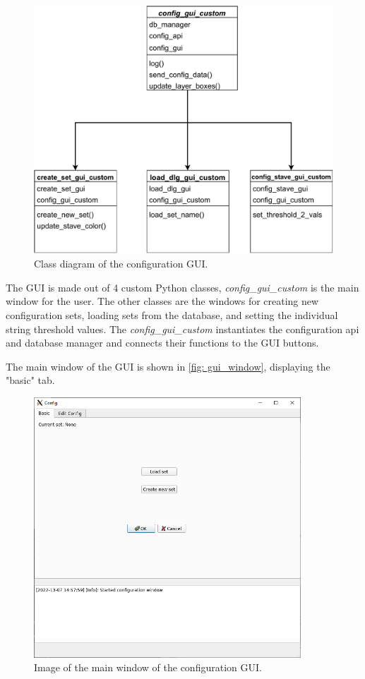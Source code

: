\documentclass[main.tex]{subfiles}
\begin{document}
\begin{figure}[!ht]
    \centering
    \includegraphics[width=12cm, scale=1.5]{images/gui_class_diagram.pdf}
    \caption{Class diagram of the configuration GUI.}
    \label{fig: gui_chart}
\end{figure}
\FloatBarrier

The GUI is made out of 4 custom Python classes, \textit{config\_gui\_custom} is the main window for the user. The other classes are the windows for creating new configuration sets, loading sets from the database, and setting the individual string threshold values. The \textit{config\_gui\_custom} instantiates the configuration \gls{api} and database manager and connects their functions to the GUI buttons.

The main window of the GUI is shown in \autoref{fig: gui_window}, displaying the "basic" tab.

\begin{figure}[!ht]
    \centering
    \includegraphics[width=10cm, scale=1.5]{images/gui_main.png}
    \caption{Image of the main window of the configuration GUI.}
    \label{fig: gui_window}
\end{figure}
\FloatBarrier
\end{document}
